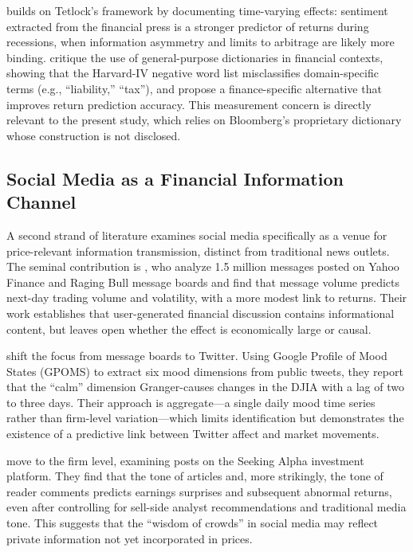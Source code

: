 \citet{garcia2013} builds on Tetlock's framework by documenting time-varying effects: sentiment
extracted from the financial press is a stronger predictor of returns during recessions, when
information asymmetry and limits to arbitrage are likely more binding. \citet{loughran2011}
critique the use of general-purpose dictionaries in financial contexts, showing that the
Harvard-IV negative word list misclassifies domain-specific terms (e.g., ``liability,'' ``tax''),
and propose a finance-specific alternative that improves return prediction accuracy. This
measurement concern is directly relevant to the present study, which relies on Bloomberg's
proprietary dictionary whose construction is not disclosed.

\subsection{Social Media as a Financial Information Channel}
\label{sec:lit_social_media}

A second strand of literature examines social media specifically as a venue for price-relevant
information transmission, distinct from traditional news outlets. The seminal contribution is
\citet{antweiler2004}, who analyze 1.5 million messages posted on Yahoo Finance and Raging Bull
message boards and find that message volume predicts next-day trading volume and volatility, with
a more modest link to returns. Their work establishes that user-generated financial discussion
contains informational content, but leaves open whether the effect is economically large or
causal.

\citet{bollen2011} shift the focus from message boards to Twitter. Using Google Profile of Mood
States (GPOMS) to extract six mood dimensions from public tweets, they report that the ``calm''
dimension Granger-causes changes in the DJIA with a lag of two to three days. Their approach is
aggregate---a single daily mood time series rather than firm-level variation---which limits
identification but demonstrates the existence of a predictive link between Twitter affect and
market movements.

\citet{chen2014} move to the firm level, examining posts on the Seeking Alpha investment platform.
They find that the tone of articles and, more strikingly, the tone of reader comments predicts
earnings surprises and subsequent abnormal returns, even after controlling for sell-side analyst
recommendations and traditional media tone. This suggests that the ``wisdom of crowds'' in social
media may reflect private information not yet incorporated in prices.

